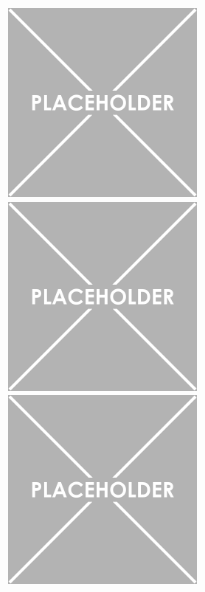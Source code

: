\documentclass[a4paper, 11pt]{report}
\begin{document}
\begin{figure}[htbp]
\centering
\begin{minipage}[b]{.32\textwidth}
\includegraphics[width=6cm, height=5cm]{figs/placeholder.png}
\end{minipage}\hfill
\begin{minipage}[b]{.32\textwidth}
\includegraphics[width=6cm, height=5cm]{figs/placeholder.png}
\end{minipage} \hfill
\begin{minipage}[b]{.32\textwidth}
\includegraphics[width=6cm, height=5cm]{figs/placeholder.png}
\end{minipage} \hfill \vspace{10pt}


\end{figure}
\end{document}
